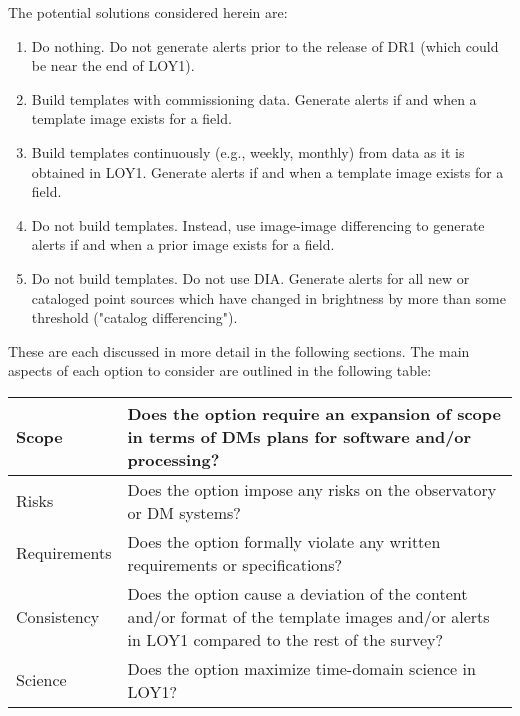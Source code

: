 \documentclass[DM,lsstdraft,toc]{lsstdoc}
\begin{document}
The potential solutions considered herein are:
\begin{enumerate}
\item Do nothing. Do not generate alerts prior to the release of DR1 (which could be near the end of LOY1).
\item Build templates with commissioning data. Generate alerts if and when a template image exists for a field. 
\item Build templates continuously (e.g., weekly, monthly) from data as it is obtained in LOY1. Generate alerts if and when a template image exists for a field.
\item Do not build templates. Instead, use image-image differencing to generate alerts if and when a prior image exists for a field.
\item Do not build templates. Do not use DIA. Generate alerts for all new or cataloged point sources which have changed in brightness by more than some threshold ("catalog differencing").
\end{enumerate}

These are each discussed in more detail in the following sections. The main aspects of each option to consider are outlined in the following table:
\begin{center}
\begin{tabular}{|p{2.5cm}|p{13cm}|}
\hline
Scope & Does the option require an expansion of scope in terms of DMs plans for software and/or processing? \\
\hline
Risks & Does the option impose any risks on the observatory or DM systems?  \\
\hline
Requirements & Does the option formally violate any written requirements or specifications? \\
\hline
Consistency & Does the option cause a deviation of the content and/or format of the template images and/or alerts in LOY1 compared to the rest of the survey? \\ %
\hline
Science & Does the option maximize time-domain science in LOY1? \\
\hline
\end{tabular}
\end{center} 
\end{document}
